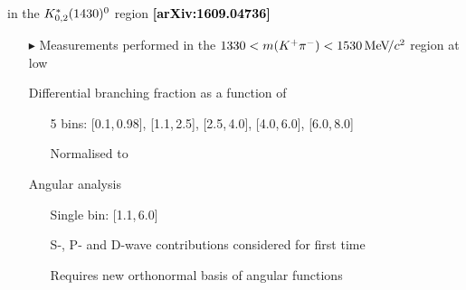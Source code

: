 \documentclass[aspectratio=1610]{beamer}
\def\Kstarfourteenthirty  {{\ensuremath{\kaon^{*}_{0,2}(1430)^{0}}}\xspace}
\begin{document}
\begin{frame}{\BdToKpimm in the \Kstarfourteenthirty region \hspace{0pt plus 1 filll} {\small \bf \textcolor{black}{[arXiv:1609.04736]}}}
\begin{itemize}
\item[$\blacktriangleright$] Measurements performed in the $1330<m({{K}^+}{{\pi}^-})<1530{\mathrm{\,Me\kern -0.1em V\!/}c^2}$ region at low \qsq
\item[]
\item[\ding{182}] Differential branching fraction as a function of \qsq
  \begin{itemize}
    \item[\ding{70}] 5 \qsq bins: [0.1,\,0.98], [1.1,\,2.5], [2.5,\,4.0], [4.0,\,6.0], [6.0,\,8.0]~\gevgevcccc
    \item[\ding{70}] Normalised to \BdToJPsiKstP
  \end{itemize}
\item[\ding{183}] Angular analysis
  \begin{itemize}
    \item[\ding{70}] Single \qsq bin: [1.1,\,6.0]~\gevgevcccc
    \item[\ding{70}] S-, P- and D-wave contributions considered for first time
    \item[\ding{70}] Requires new orthonormal basis of angular functions 
  \end{itemize}
  
\end{itemize}
\end{frame}
\end{document}
